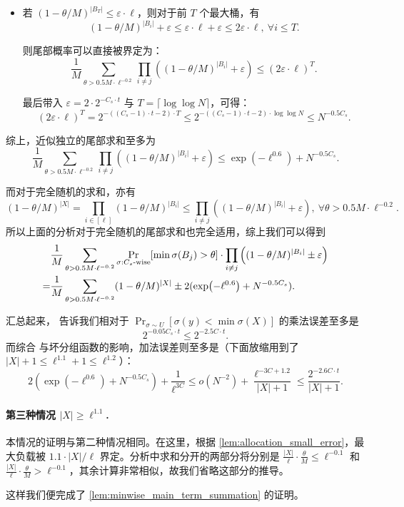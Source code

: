\begin{itemize}
    \item 若 $(1 - \theta / M)^{|B_T|} \le \varepsilon \cdot \ell$，则对于前 $T$ 个最大桶，有
    $$
    (1 - \theta / M)^{|B_i|} + \varepsilon \le \varepsilon \cdot \ell + \varepsilon \le 2 \varepsilon \cdot \ell,\ \forall i \le T.
    $$

    则尾部概率可以直接被界定为：
    $$
    \frac{1}{M} \sum_{\theta > 0.5 M \cdot \ell^{-0.2}} \prod_{i \ne j} \left( (1 - \theta / M)^{|B_i|} + \varepsilon \right) \le (2 \varepsilon \cdot \ell)^T.
    $$

    最后带入 $\varepsilon = 2 \cdot 2^{-C_s \cdot t}$ 与 $T = \lceil \log \log N \rceil$，可得：
    $$
    (2 \varepsilon \cdot \ell)^T = 2^{-((C_s - 1) \cdot t - 2) \cdot T} \le 2^{-((C_s - 1) \cdot t - 2) \cdot \log \log N} \le N^{-0.5 C_s}.
    $$
\end{itemize}

综上，近似独立的尾部求和至多为
$$
\frac{1}{M} \sum_{\theta > 0.5 M \cdot \ell^{-0.2}} \prod_{i \ne j} \left( (1 - \theta / M)^{|B_i|} + \varepsilon \right) \le \exp(-\ell^{0.6}) + N^{-0.5 C_s}.
$$

而对于完全随机的求和，亦有
$$
(1 - \theta / M)^{|X|} = \prod_{i \in [\ell]} (1 - \theta / M)^{|B_i|} \le \prod_{i \ne j} \left( (1 - \theta / M)^{|B_i|} + \varepsilon \right),\ \forall \theta > 0.5 M \cdot \ell^{-0.2}.
$$
所以上面的分析对于完全随机的尾部求和也完全适用，综上我们可以得到
\begin{align}
      & \frac{1}{M} \sum_{\theta > 0.5 M \cdot \ell^{-0.2}} \Pr_{\sigma : C_s\text{-wise}}[\min \sigma(B_j) > \theta] \cdot \prod_{i \ne j} \left( (1 - \theta / M)^{|B_i|} \pm \varepsilon \right) \notag \\
    = & \frac{1}{M} \sum_{\theta > 0.5 M \cdot \ell^{-0.2}} (1 - \theta / M)^{|X|} \pm 2 (\exp(-\ell^{0.6}) + N^{-0.5 C_s}). \label{eq:X2_theta_big}
\end{align}

汇总起来， 告诉我们相对于 $\Pr_{\sigma \sim U}[\sigma(y) < \min \sigma(X)]$ 的乘法误差至多是
$$
2^{-0.05 C_s \cdot t} \le 2^{-2.5 C \cdot t}.
$$
而综合  与坏分组函数的影响，加法误差则至多是（下面放缩用到了 $|X| + 1 \le \ell^{1.1} + 1 \le \ell^{1.2}$）：
$$
2 (\exp(-\ell^{0.6}) + N^{-0.5 C_s}) + \frac{1}{\ell^{3 C}} \le o( N^{-2} ) + \frac{\ell^{-3 C + 1.2}}{|X| + 1} \le \frac{2^{-2.6 C \cdot t}}{|X| + 1}.
$$

\paragraph{第三种情况 $|X| \ge \ell^{1.1}$.}

本情况的证明与第二种情况相同。在这里，根据 \cref{lem:allocation_small_error}，最大负载被 $1.1 \cdot |X| / \ell$ 界定。分析中求和分开的两部分将分别是 $\frac{|X|}{\ell} \cdot \frac{\theta}{M} \le \ell^{-0.1}$ 和 $\frac{|X|}{\ell} \cdot \frac{\theta}{M} > \ell^{-0.1}$，其余计算非常相似，故我们省略这部分的推导。

\bigskip

这样我们便完成了 \cref{lem:minwise_main_term_summation} 的证明。